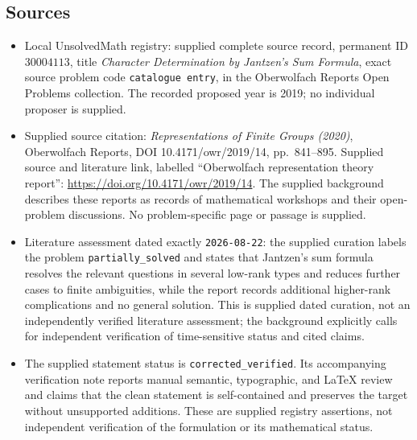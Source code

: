 \documentclass[11pt]{article}
\begin{document}
\subsection{Sources}
\begin{itemize}
\item Local UnsolvedMath registry: supplied complete source record, permanent ID \(30004113\), title \emph{Character Determination by Jantzen's Sum Formula}, exact source problem code \texttt{catalogue entry}, in the Oberwolfach Reports Open Problems collection. The recorded proposed year is 2019; no individual proposer is supplied.
\item Supplied source citation: \emph{Representations of Finite Groups (2020)}, Oberwolfach Reports, DOI 10.4171/owr/2019/14, pp.\ 841--895. Supplied source and literature link, labelled ``Oberwolfach representation theory report'': \url{https://doi.org/10.4171/owr/2019/14}. The supplied background describes these reports as records of mathematical workshops and their open-problem discussions. No problem-specific page or passage is supplied.
\item Literature assessment dated exactly \texttt{2026-08-22}: the supplied curation labels the problem \texttt{partially\_solved} and states that Jantzen's sum formula resolves the relevant questions in several low-rank types and reduces further cases to finite ambiguities, while the report records additional higher-rank complications and no general solution. This is supplied dated curation, not an independently verified literature assessment; the background explicitly calls for independent verification of time-sensitive status and cited claims.
\item The supplied statement status is \texttt{corrected\_verified}. Its accompanying verification note reports manual semantic, typographic, and LaTeX review and claims that the clean statement is self-contained and preserves the target without unsupported additions. These are supplied registry assertions, not independent verification of the formulation or its mathematical status.
\end{itemize}
\end{document}

